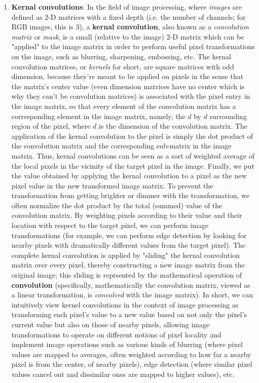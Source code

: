 \documentclass{article}
\begin{document}
\begin{enumerate}
\begin{enumerate}
        \begin{enumerate}
            \item \textbf{Kernal convolutions}: In the field of image processing, where \textit{images} are defined as 2-D matrices with a fixed depth (i.e. the number of channels; for RGB images, this is 3), a \textbf{kernal convolution}, also known as a \textit{convolution matrix} or \textit{mask}, is a small (relative to the image) 2-D matrix which can be "applied" to the image matrix in order to perform useful pixel transformations on the image, such as blurring, sharpening, embossing, etc. The kernal convolution matrices, or \textit{kernels} for short, are square matrices with odd dimension, because they're meant to be applied on pixels in the sense that the matrix's center value (even dimension matrices have no center which is why they can't be convolution matrices) is associated with the pixel entry in the image matrix, so that every element of the convolution matrix has a corresponding element in the image matrix, namely, the $ d $ by $ d $ surrounding region of the pixel, where $ d $ is the dimension of the convolution matrix. The application of the kernal convolution to the pixel is simply the dot product of the convolution matrix and the corresponding sub-matrix in the image matrix. Thus, kernal convolutions can be seen as a sort of weighted average of the local pixels in the vicinity of the target pixel in the image. Finally, we put the value obtained by applying the kernal convolution to a pixel as the new pixel value in the new transformed image matrix. To prevent the transformation from getting brighter or dimmer with the transformation, we often normalize the dot product by the total (summed) value of the convolution matrix. By weighting pixels according to their value and their location with respect to the target pixel, we can perform image transformations (for example, we can perform edge detection by looking for nearby pixels with dramatically different values from the target pixel). The complete kernal convolution is applied by "sliding" the kernal convolution matrix over every pixel, thereby constructing a new image matrix from the original image; this sliding is reprsented by the mathematical operation of \textbf{convolution} (specifically, mathematically the convolution matrix, viewed as a linear transformation, is \textit{convolved} with the image matrix). In short, we can intuitively view kernel convolutions in the context of image processing as transforming each pixel's value to a new value based on not only the pixel's current value but also on those of nearby pixels, allowing image transformations to operate on different notions of pixel locality and implement image operations such as various kinds of blurring (where pixel values are mapped to averages, often weighted according to how far a nearby pixel is from the center, of nearby pixels), edge detection (where similar pixel values cancel out and dissimilar ones are mapped to higher values), etc.

\end{enumerate}
\end{enumerate}
\end{enumerate}
\end{document}
